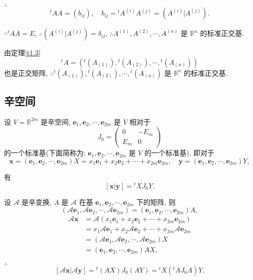\documentclass{ctexart}
\begin{document}
$\therefore$
\[{}^tAA=(b_{ij}),\quad b_{ij}={}^tA^{(i)}A^{(j)}=(A^{(i)}|A^{(j)}).\]

$\because{}^tAA=E$, $\therefore(A^{(i)}|A^{(j)})=\delta_{ij}$, $\therefore A^{(1)},A^{(2)},\cdots,A^{(n)}$ 是 $\mathbb{R}^n$ 的标准正交基.

由定理\ref{t1.3}
\[{}^tA=({}^t(A_{(1)}),{}^t(A_{(2)}),\cdots,{}^t(A_{(n)}))\]
也是正交矩阵, $\therefore{}^t(A_{(1)}),{}^t(A_{(2)}),\cdots,{}^t(A_{(n)})$ 是 $\mathbb{R}^n$ 的标准正交基.
\subsection{辛空间}
设 $V=\mathbb{R}^{2m}$ 是辛空间, $\boldsymbol{e}_1,\boldsymbol{e}_2,\cdots,\boldsymbol{e}_{2m}$ 是 $V$ 相对于
\[J_0=\begin{pmatrix}
    0 & -E_m \\
    E_m & 0
\end{pmatrix}\]
的一个标准基(下面简称为: $\boldsymbol{e}_1,\boldsymbol{e}_2,\cdots,\boldsymbol{e}_{2m}$ 是 $V$ 的一个标准基), 即对于
\[\boldsymbol{x}=(\boldsymbol{e}_1,\boldsymbol{e}_2,\cdots,\boldsymbol{e}_{2m})X=x_1\boldsymbol{e}_1+x_2\boldsymbol{e}_2+\cdots+x_{2m}\boldsymbol{e}_{2m},\quad\boldsymbol{y}=(\boldsymbol{e}_1,\boldsymbol{e}_2,\cdots,\boldsymbol{e}_{2m})Y,\]

有
\[[\boldsymbol{x}|\boldsymbol{y}]={}^tXJ_0Y.\]

设 $\mathcal{A}$ 是辛变换, $A$ 是 $\mathcal{A}$ 在基 $\boldsymbol{e}_1,\boldsymbol{e}_2,\cdots,\boldsymbol{e}_{2m}$ 下的矩阵, 则
\[(\mathcal{A}\boldsymbol{e}_1,\mathcal{A}\boldsymbol{e}_2,\cdots,\mathcal{A}\boldsymbol{e}_{2m})=(\boldsymbol{e}_1,\boldsymbol{e}_2,\cdots,\boldsymbol{e}_{2m})A,\]
\begin{align*}
    \mathcal{A}\boldsymbol{x} & =\mathcal{A}(x_1\boldsymbol{e}_1+x_2\boldsymbol{e}_2+\cdots+x_{2m}\boldsymbol{e}_{2m}) \\
    & =x_1\mathcal{A}\boldsymbol{e}_1+x_2\mathcal{A}\boldsymbol{e}_2+\cdots+x_{2m}\mathcal{A}\boldsymbol{e}_{2m} \\
    & =(\mathcal{A}\boldsymbol{e}_1,\mathcal{A}\boldsymbol{e}_2,\cdots,\mathcal{A}\boldsymbol{e}_{2m})X \\
    & =(\boldsymbol{e}_1,\boldsymbol{e}_2,\cdots,\boldsymbol{e}_{2m})AX,
\end{align*}

$\therefore$
\[[\mathcal{A}\boldsymbol{x}|\mathcal{A}\boldsymbol{y}]={}^t(AX)J_0(AY)={}^tX({}^tAJ_0A)Y.\]
\end{document}
